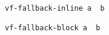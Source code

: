 \documentclass{article}
\begin{document}
\verb|vf-fallback-inline a  b|
\begin{verbatim}
vf-fallback-block a  b
\end{verbatim}

\end{document}
